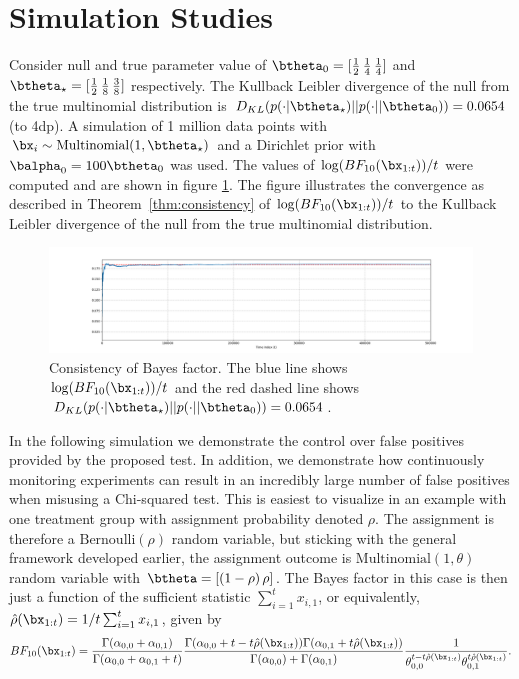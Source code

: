 \documentclass[11pt]{article}
\def\log{{\rm log}}
\begin{document}
\section{Simulation Studies}
\label{sec:simulation}
Consider null and true parameter value of $\btheta_0=[\frac{1}{2}\, \frac{1}{4}\, \frac{1}{4}]$ and $\btheta_\star=[\frac{1}{2}\, \frac{1}{8}\, \frac{3}{8}]$ respectively.
The Kullback Leibler divergence of the null from the true multinomial distribution is $D_{KL}(p(\cdot|\btheta_\star)||p(\cdot||\btheta_0)) = 0.0654$ (to 4dp).
A simulation of 1 million data points with $\bx_i \sim \text{Multinomial}(1, \btheta_\star)$ and a Dirichlet prior with $\balpha_0 = 100\btheta_0$ was used.
The values of $\log(BF_{10}(\bx_{1:t}))/t$ were computed and are shown in figure \ref{fig:lbf}.
The figure illustrates the convergence as described in Theorem~\ref{thm:consistency} of $\log(BF_{10}(\bx_{1:t}))/t$ to the Kullback Leibler divergence of the null from the true multinomial distribution.
\begin{figure}[H]
  \centering
  \includegraphics[scale=0.35]{images/consistency.png}
  \caption{Consistency of Bayes factor.
The blue line shows $\log(BF_{10}(\bx_{1:t}))/t$ and the red dashed line shows $D_{KL}(p(\cdot|\btheta_\star)||p(\cdot||\btheta_0)) = 0.0654$.}
    \label{fig:lbf}
  \end{figure}
  In the following simulation we demonstrate the control over false positives provided by the proposed test.
In addition, we demonstrate how continuously monitoring experiments can result in an incredibly large number of false positives when misusing a Chi-squared test.
This is easiest to visualize in an example with one treatment group with assignment probability denoted $\rho$.
The assignment is therefore a $\text{Bernoulli}(\rho)$ random variable, but sticking with the general framework developed earlier, the assignment outcome is $\text{Multinomial}(1,\theta)$ random variable with $\btheta = [(1-\rho)\, \rho]$.
The Bayes factor in this case is then just a function of the sufficient statistic $\sum_{i=1}^t x_{i,1}$, or equivalently, $\hat{\rho}(\bx_{1:t}) = 1/t \sum_{i=1}^{t} x_{i,1}$, given by
\begin{equation}
  \label{eq:bayes_factor}
 BF_{10}(\bx_{1:t})  = \frac{\Gamma(\alpha_{0,0}+\alpha_{0,1})}{\Gamma(\alpha_{0,0}+\alpha_{0,1}+t)}\frac{\Gamma(\alpha_{0,0} + t-t\hat{\rho}(\bx_{1:t} ))\Gamma(\alpha_{0,1} + t\hat{\rho}(\bx_{1:t} )) }{\Gamma(\alpha_{0,0} )+\Gamma(\alpha_{0,1} )}\frac{1}{\theta_{0,0}^{t-t\hat{\rho}(\bx_{1:t})}\theta_{0,1}^{t\hat{\rho}(\bx_{1:t})}}.
\end{equation}
\end{document}
